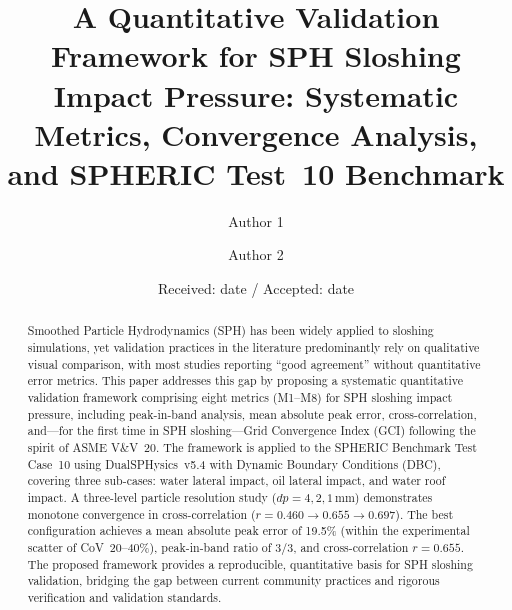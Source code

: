 \documentclass[twocolumn]{svjour3}
\begin{document}
\title{A Quantitative Validation Framework for SPH Sloshing Impact Pressure:
Systematic Metrics, Convergence Analysis, and SPHERIC Test~10 Benchmark}


\author{Author 1 \and
        Author 2}


\date{Received: date / Accepted: date}

\maketitle

\begin{abstract}
%
Smoothed Particle Hydrodynamics (SPH) has been widely applied to sloshing
simulations, yet validation practices in the literature predominantly rely on
qualitative visual comparison, with most studies reporting ``good agreement''
without quantitative error metrics.
%
This paper addresses this gap by proposing a systematic quantitative validation
framework comprising eight metrics (M1--M8) for SPH sloshing impact pressure,
including peak-in-band analysis, mean absolute peak error, cross-correlation,
and---for the first time in SPH sloshing---Grid Convergence Index (GCI)
following the spirit of ASME V\&V~20.
%
The framework is applied to the SPHERIC Benchmark Test Case~10 using
DualSPHysics~v5.4 with Dynamic Boundary Conditions (DBC), covering three
sub-cases: water lateral impact, oil lateral impact, and water roof impact.
%
A three-level particle resolution study (\(dp = 4, 2, 1\)\,mm) demonstrates
monotone convergence in cross-correlation (\(r = 0.460 \to 0.655 \to 0.697\)).
The best configuration achieves a mean absolute peak error of 19.5\%
(within the experimental scatter of CoV~20--40\%), peak-in-band ratio of 3/3,
and cross-correlation \(r = 0.655\).
%
The proposed framework provides a reproducible, quantitative basis for SPH
sloshing validation, bridging the gap between current community practices and
rigorous verification and validation standards.

\end{abstract}
\end{document}
